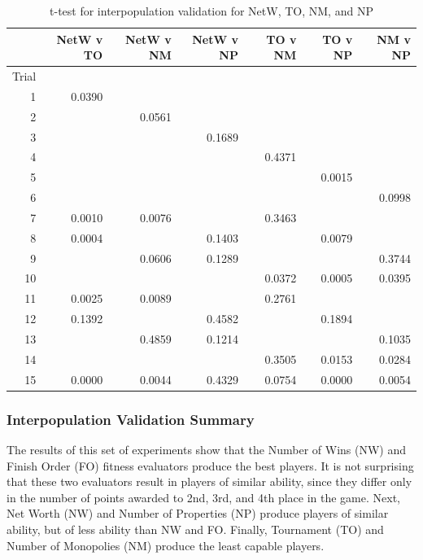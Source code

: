 \begin{table}[htbp]
  \centering
  \caption{t-test for interpopulation validation for NetW, TO, NM, and NP}
    \begin{tabular}{rrrrrrr}
    \toprule
          & NetW v TO & NetW v NM & NetW v NP & TO v NM & TO v NP & NM v NP \\
    \midrule
    Trial &        &        &        &        &        &  \\
    1     & 0.0390 &        &        &        &        &  \\
    2     &        & 0.0561 &        &        &        &  \\
    3     &        &        & 0.1689 &        &        &  \\
    4     &        &        &        & 0.4371 &        &  \\
    5     &        &        &        &        & 0.0015 &  \\
    6     &        &        &        &        &        & 0.0998 \\
    7     & 0.0010 & 0.0076 &        & 0.3463 &        &  \\
    8     & 0.0004 &        & 0.1403 &        & 0.0079 &  \\
    9     &        & 0.0606 & 0.1289 &        &        & 0.3744 \\
    10    &        &        &        & 0.0372 & 0.0005 & 0.0395 \\
    11    & 0.0025 & 0.0089 &        & 0.2761 &        &  \\
    12    & 0.1392 &        & 0.4582 &        & 0.1894 &  \\
    13    &        & 0.4859 & 0.1214 &        &        & 0.1035 \\
    14    &        &        &        & 0.3505 & 0.0153 & 0.0284 \\
    15    & 0.0000 & 0.0044 & 0.4329 & 0.0754 & 0.0000 & 0.0054 \\
    \bottomrule
    \end{tabular}%
  \label{tab:interpop_ttest3}%
\end{table}%

\subsubsection{Interpopulation Validation Summary}

The results of this set of experiments show that the Number of Wins (NW) and
Finish Order (FO) fitness evaluators produce the best players. It is not
surprising that these two evaluators result in players of similar ability,
since they differ only in the number of points awarded to 2nd, 3rd, and 4th
place in the game. Next, Net Worth (NW) and Number of Properties (NP) produce players
of similar ability, but of less ability than NW and FO. Finally, Tournament (TO)
and Number of Monopolies (NM) produce the least capable players.

